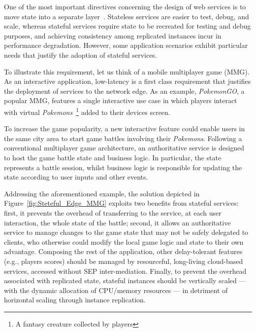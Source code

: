 One of the most important directives concerning the design of web services is to move state into a separate layer~\cite{Armbrust:2010}. Stateless services are easier to test, debug, and scale, whereas stateful services require state to be recreated for testing and debug purposes, and achieving consistency among replicated instances incur in performance degradation. However, some application scenarios exhibit particular needs that justify the adoption of stateful services.


To illustrate this requirement, let us think of a mobile multiplayer game (MMG). As an interactive application, low-latency is a first class requirement that justifies the deployment of services to the network edge. As an example, \textit{PokemonGO}, a popular MMG, features a single interactive use case in which players interact with virtual \textit{Pokemons}~\footnote{A fantasy creature collected by players} added to their devices screen. 
%

To increase the game popularity, a new interactive feature could enable users in the same city area to start game battles involving their \textit{Pokemons}. Following a conventional multiplayer game architecture, an authoritative service is designed to host the game battle state and business logic. In particular, the state represents a battle session, whilst business logic is responsible for updating the state according to user inputs and other events. 

Addressing the aforementioned example, the solution depicted in Figure~\ref{fig:Steteful_Edge_MMG} exploits two benefits from stateful services: first, it prevents the overhead of transferring to the service, at each user interaction, the whole state of the battle; second, it allows an authoritative service to manage changes to the game state that may not be safely delegated to clients, who otherwise could modify the local game logic and state to their own advantage.
Composing the rest of the application, other delay-tolerant features (e.g., players scores) should be managed by resourceful, long-living cloud-based services, accessed without SEP inter-mediation. Finally, to prevent the overhead associated with replicated state, stateful instances should be vertically scaled --- with the dynamic allocation of CPU/memory resources --- in detriment of horizontal scaling through instance replication. %

